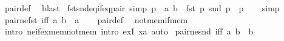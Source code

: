 \begin{isabellebody}
%
\isatagproof
{}\isamarkupfalse%
\ pair{\isacharunderscore}{\kern0pt}def\ \isamarkupfalse%
\ blast%
\endisatagproof
{\isafoldproof}%
%
\isadelimproof
\isanewline
%
\endisadelimproof
\isanewline
{}\isamarkupfalse%
\ fst{\isacharunderscore}{\kern0pt}snd{\isacharunderscore}{\kern0pt}eq{\isacharunderscore}{\kern0pt}if{\isacharunderscore}{\kern0pt}eq{\isacharunderscore}{\kern0pt}pair\ {\isacharbrackleft}{\kern0pt}simp{\isacharbrackright}{\kern0pt}{\isacharcolon}{\kern0pt}\ {\isachardoublequoteopen}p\ {\isacharequal}{\kern0pt}\ {\isasymlangle}a{\isacharcomma}{\kern0pt}\ b{\isasymrangle}\ {\isasymLongrightarrow}\ {\isasymlangle}fst\ p{\isacharcomma}{\kern0pt}\ snd\ p{\isasymrangle}\ {\isacharequal}{\kern0pt}\ p{\isachardoublequoteclose}\isanewline
%
\isadelimproof
\ \ %
\endisadelimproof
%
\isatagproof
{}\isamarkupfalse%
\ simp%
\endisatagproof
{\isafoldproof}%
%
\isadelimproof
\isanewline
%
\endisadelimproof
\isanewline
{}\isamarkupfalse%
\ pair{\isacharunderscore}{\kern0pt}ne{\isacharunderscore}{\kern0pt}fst\ {\isacharbrackleft}{\kern0pt}iff{\isacharbrackright}{\kern0pt}{\isacharcolon}{\kern0pt}\ {\isachardoublequoteopen}{\isasymlangle}a{\isacharcomma}{\kern0pt}\ b{\isasymrangle}\ {\isasymnoteq}\ a{\isachardoublequoteclose}\isanewline
%
\isadelimproof
\ \ %
\endisadelimproof
%
\isatagproof
{}\isamarkupfalse%
\ pair{\isacharunderscore}{\kern0pt}def\ \isamarkupfalse%
\ not{\isacharunderscore}{\kern0pt}mem{\isacharunderscore}{\kern0pt}if{\isacharunderscore}{\kern0pt}mem\isanewline
\ \ \isamarkupfalse%
\ {\isacharparenleft}{\kern0pt}intro\ ne{\isacharunderscore}{\kern0pt}if{\isacharunderscore}{\kern0pt}ex{\isacharunderscore}{\kern0pt}mem{\isacharunderscore}{\kern0pt}not{\isacharunderscore}{\kern0pt}mem{\isacharcomma}{\kern0pt}\ intro\ exI{\isacharbrackleft}{\kern0pt}\ x{\isacharequal}{\kern0pt}{\isachardoublequoteopen}{\isacharbraceleft}{\kern0pt}a{\isacharbraceright}{\kern0pt}{\isachardoublequoteclose}{\isacharbrackright}{\kern0pt}{\isacharparenright}{\kern0pt}\ auto%
\endisatagproof
{\isafoldproof}%
%
\isadelimproof
\isanewline
%
\endisadelimproof
\isanewline
{}\isamarkupfalse%
\ pair{\isacharunderscore}{\kern0pt}ne{\isacharunderscore}{\kern0pt}snd\ {\isacharbrackleft}{\kern0pt}iff{\isacharbrackright}{\kern0pt}{\isacharcolon}{\kern0pt}\ {\isachardoublequoteopen}{\isasymlangle}a{\isacharcomma}{\kern0pt}\ b{\isasymrangle}\ {\isasymnoteq}\ b{\isachardoublequoteclose}\isanewline
%
\isadelimproof
\ \ %

\end{isabellebody}
